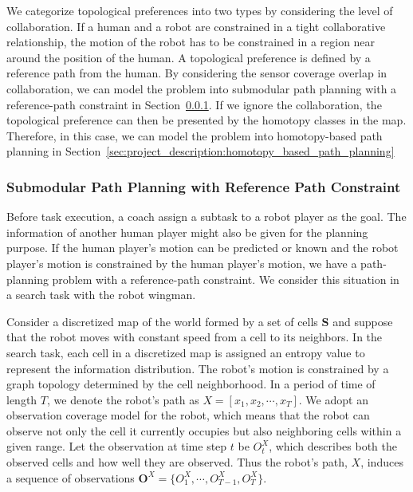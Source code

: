 \documentclass[phd]{byuprop}
\begin{document}
We categorize topological preferences into two types by considering the level of collaboration.
If a human and a robot are constrained in a tight collaborative relationship, the motion of the robot has to be constrained in a region near around the position of the human.
A topological preference is defined by a reference path from the human.
By considering the sensor coverage overlap in collaboration, we can model the problem into submodular path planning with a reference-path constraint in Section~\ref{sec:project_description:submodular_path_planning_with_reference_path_constraint}.
If we ignore the collaboration, the topological preference can then be presented by the homotopy classes in the map.
Therefore, in this case, we can model the problem into homotopy-based path planning in Section~\ref{sec:project_description:homotopy_based_path_planning} 

\subsubsection{Submodular Path Planning with Reference Path Constraint}
\label{sec:project_description:submodular_path_planning_with_reference_path_constraint}

Before task execution, a coach assign a subtask to a robot player as the goal.
The information of another human player might also be given for the planning purpose.
If the human player's motion can be predicted or known and the robot player's motion is constrained by the human player's motion, we have a path-planning problem with a reference-path constraint.
We consider this situation in a search task with the robot wingman.

Consider a discretized map of the world formed by a set of cells $ \mathbf{S}$ and suppose that the robot moves with constant speed from a cell to its neighbors.
In the search task, each cell in a discretized map is assigned an entropy value to represent the information distribution.
The robot's motion is constrained by a graph topology determined by the cell neighborhood. 
In a period of time of length $ T $, we denote the robot's path as $ X = [x_{1}, x_{2} , \cdots , x_{T}] $.
We adopt an observation coverage model for the robot, which means that the robot can observe not only the cell it currently occupies but also neighboring cells within a given range.
Let the observation at time step $ t $ be $ O^{X}_{t} $, which describes both the observed cells and how well they are observed.
Thus the robot's path, $X$, induces a sequence of observations $ \mathbf{O}^{X} = \{ O^{X}_{1}, \cdots , O^{X}_{T-1}, O^{X}_{T} \}$.
\end{document}
